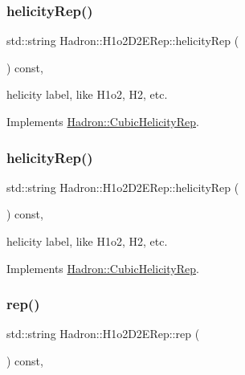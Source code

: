 \subsubsection{\texorpdfstring{helicityRep()}{helicityRep()}\hspace{0.1cm}{\footnotesize\ttfamily [2/3]}}
{\footnotesize\ttfamily std\+::string Hadron\+::\+H1o2\+D2\+E\+Rep\+::helicity\+Rep (\begin{DoxyParamCaption}{ }\end{DoxyParamCaption}) const\hspace{0.3cm}{\ttfamily [inline]}, {\ttfamily [virtual]}}

helicity label, like H1o2, H2, etc. 

Implements \mbox{\hyperlink{structHadron_1_1CubicHelicityRep_af1096946b7470edf0a55451cc662f231}{Hadron\+::\+Cubic\+Helicity\+Rep}}.

\mbox{\label{structHadron_1_1H1o2D2ERep_a8c9ee9d587a013968ba36b769ddccfc3}} 
\subsubsection{\texorpdfstring{helicityRep()}{helicityRep()}\hspace{0.1cm}{\footnotesize\ttfamily [3/3]}}
{\footnotesize\ttfamily std\+::string Hadron\+::\+H1o2\+D2\+E\+Rep\+::helicity\+Rep (\begin{DoxyParamCaption}{ }\end{DoxyParamCaption}) const\hspace{0.3cm}{\ttfamily [inline]}, {\ttfamily [virtual]}}

helicity label, like H1o2, H2, etc. 

Implements \mbox{\hyperlink{structHadron_1_1CubicHelicityRep_af1096946b7470edf0a55451cc662f231}{Hadron\+::\+Cubic\+Helicity\+Rep}}.

\mbox{\label{structHadron_1_1H1o2D2ERep_ac801e3e5c50b7740398e08b907cae155}} 
\subsubsection{\texorpdfstring{rep()}{rep()}\hspace{0.1cm}{\footnotesize\ttfamily [1/5]}}
{\footnotesize\ttfamily std\+::string Hadron\+::\+H1o2\+D2\+E\+Rep\+::rep (\begin{DoxyParamCaption}{ }\end{DoxyParamCaption}) const\hspace{0.3cm}{\ttfamily [inline]}, {\ttfamily [virtual]}}



